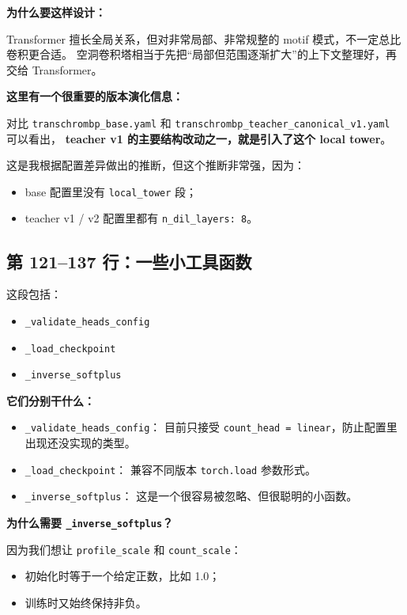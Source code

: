 \documentclass[11pt,a4paper]{ctexart}
\begin{document}
\textbf{为什么要这样设计：}

Transformer 擅长全局关系，但对非常局部、非常规整的 motif 模式，不一定总比卷积更合适。
空洞卷积塔相当于先把“局部但范围逐渐扩大”的上下文整理好，再交给 Transformer。

\textbf{这里有一个很重要的版本演化信息：}

对比 \texttt{transchrombp\_base.yaml} 和
\texttt{transchrombp\_teacher\_canonical\_v1.yaml} 可以看出，
\textbf{teacher v1 的主要结构改动之一，就是引入了这个 local tower}。

这是我根据配置差异做出的推断，但这个推断非常强，因为：

\begin{itemize}[leftmargin=2em]
\item base 配置里没有 \texttt{local\_tower} 段；
\item teacher v1 / v2 配置里都有 \texttt{n\_dil\_layers: 8}。
\end{itemize}

\subsection{第 121--137 行：一些小工具函数}

这段包括：

\begin{itemize}[leftmargin=2em]
\item \texttt{\_validate\_heads\_config}
\item \texttt{\_load\_checkpoint}
\item \texttt{\_inverse\_softplus}
\end{itemize}

\textbf{它们分别干什么：}

\begin{itemize}[leftmargin=2em]
\item \texttt{\_validate\_heads\_config}：
  目前只接受 \texttt{count\_head = linear}，防止配置里出现还没实现的类型。
\item \texttt{\_load\_checkpoint}：
  兼容不同版本 \texttt{torch.load} 参数形式。
\item \texttt{\_inverse\_softplus}：
  这是一个很容易被忽略、但很聪明的小函数。
\end{itemize}

\textbf{为什么需要 \texttt{\_inverse\_softplus}？}

因为我们想让 \texttt{profile\_scale} 和 \texttt{count\_scale}：

\begin{itemize}[leftmargin=2em]
\item 初始化时等于一个给定正数，比如 1.0；
\item 训练时又始终保持非负。
\end{itemize}
\end{document}
